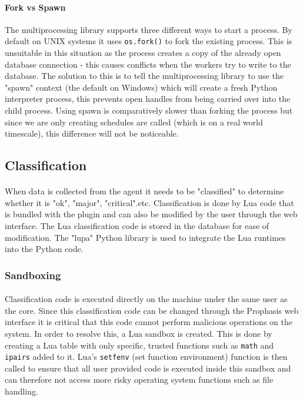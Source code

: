 \documentclass[bsc,logo,twoside]{infthesis}
\begin{document}
\paragraph*{Fork vs Spawn}
	The multiprocessing library supports three different ways to start a process.
	By default on UNIX systems it uses \texttt{os.fork()} to fork the existing
	process. This is unsuitable in this situation as the process creates a copy of
	the already open database connection - this causes conflicts when the workers
	try to write to the database.  The solution to this is to tell the
	multiprocessing library to use the "spawn" context (the default on Windows)
	which will create a fresh Python interpreter process, this prevents open
	handles from being carried over into the child process. Using spawn is
	comparatively slower than forking the process but since we are only creating
	schedules are called (which is on a real world timescale), this difference will
	not be noticeable.

\subsection{Classification}
\paragraph*{}
	When data is collected from the agent it needs to be "classified" to determine
	whether it is "ok", "major", "critical".etc.  Classification is done by Lua
	code that is bundled with the plugin and can also be modified by the user
	through the web interface.  The Lua classification code is stored in the
	database for ease of modification.  The "lupa" Python library is used to
	integrate the Lua runtimes into the Python code.

\subsubsection{Sandboxing}
\label{classification_sandboxing}
\paragraph*{}
	Classification code is executed directly on the machine under the same user as
	the core.  Since this classification code can be changed through the Prophasis
	web interface it is critical that this code cannot perform malicious operations
	on the system.  In order to resolve this, a Lua sandbox is created.  This is
	done by creating a Lua table with only specific, trusted functions such as
	\texttt{math} and \texttt{ipairs} added to it.  Lua's \texttt{setfenv} (set
	function environment) function is then called to ensure that all user provided
	code is executed inside this sandbox and can therefore not access more risky
	operating system functions such as file handling.
\end{document}
